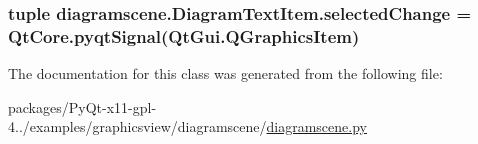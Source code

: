 \subsubsection[{selected\+Change}]{\setlength{\rightskip}{0pt plus 5cm}tuple diagramscene.\+Diagram\+Text\+Item.\+selected\+Change = Qt\+Core.\+pyqt\+Signal(Qt\+Gui.\+Q\+Graphics\+Item)\hspace{0.3cm}{\ttfamily [static]}}\label{classdiagramscene_1_1DiagramTextItem_af3589e91f36594adb07f449da7cb4144}


The documentation for this class was generated from the following file\+:\begin{DoxyCompactItemize}
\item 
packages/\+Py\+Qt-\/x11-\/gpl-\/4../examples/graphicsview/diagramscene/\hyperlink{diagramscene_8py}{diagramscene.\+py}\end{DoxyCompactItemize}

